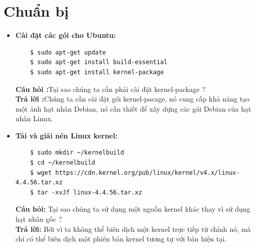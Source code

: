 \documentclass[a4paper,12pt]{article}
\begin{document}
\newpage
	\section{Chuẩn bị}
	\begin{itemize}
	\item \textbf{Cài đặt các gói cho Ubuntu:}
	\begin{verbatim}
	$ sudo apt-get update
	$ sudo apt-get install build-essential
	$ sudo apt-get install kernel-package
	\end{verbatim}
	\textbf{Câu hỏi :}Tại sao chúng ta cần phải cài đặt kernel-package ? \\
	\textbf{Trả lời :}Chúng ta cần cài đặt gói kernel-pacage, nó cung cấp khả năng tạo một ảnh hạt nhân Debian, nó cần thiết để xây dựng các gói Debian của hạt nhân Linux.
	\item \textbf{Tải và giải nén Linux kernel:}
	\begin{verbatim}
	$ sudo mkdir ~/kernelbuild
	$ cd ~/kernelbuild
	$ wget https://cdn.kernel.org/pub/linux/kernel/v4.x/linux-4.4.56.tar.xz
	$ tar -xvJf linux-4.4.56.tar.xz
	\end{verbatim}
	\textbf{Câu hỏi: }Tại sao chúng ta sử dụng một nguồn kernel khác thay vì sử dụng hạt nhân gốc ? \\
	\textbf{Trả lời: }Bởi vì ta không thể biên dịch một kernel trực tiếp từ chính nó, mà chỉ có thể biên dịch một phiên bản kernel tương tự với bản hiện tại.
	\end{itemize}
\end{document}
